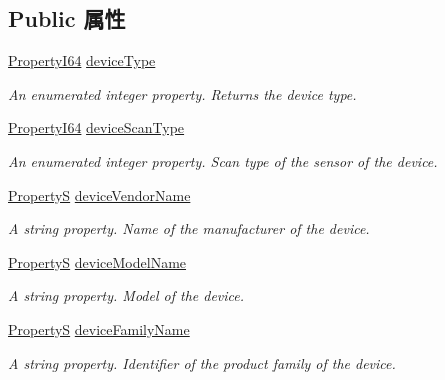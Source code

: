 \subsection*{Public 属性}
\begin{DoxyCompactItemize}
\item 
\hyperlink{group___common_interface_ga81749b2696755513663492664a18a893}{Property\+I64} \hyperlink{classmv_i_m_p_a_c_t_1_1acquire_1_1_gen_i_cam_1_1_device_control_a3dc9c27ac4a77bac7c2590ef4cb56f15}{device\+Type}
\begin{DoxyCompactList}\small\item\em An enumerated integer property. Returns the device type. \end{DoxyCompactList}\item 
\hyperlink{group___common_interface_ga81749b2696755513663492664a18a893}{Property\+I64} \hyperlink{classmv_i_m_p_a_c_t_1_1acquire_1_1_gen_i_cam_1_1_device_control_a9a0cf61d40c7454be475abefd64ab35d}{device\+Scan\+Type}
\begin{DoxyCompactList}\small\item\em An enumerated integer property. Scan type of the sensor of the device. \end{DoxyCompactList}\item 
\hyperlink{classmv_i_m_p_a_c_t_1_1acquire_1_1_property_s}{Property\+S} \hyperlink{classmv_i_m_p_a_c_t_1_1acquire_1_1_gen_i_cam_1_1_device_control_aea67bea3bea7c8c363bb3c6100e7004f}{device\+Vendor\+Name}
\begin{DoxyCompactList}\small\item\em A string property. Name of the manufacturer of the device. \end{DoxyCompactList}\item 
\hyperlink{classmv_i_m_p_a_c_t_1_1acquire_1_1_property_s}{Property\+S} \hyperlink{classmv_i_m_p_a_c_t_1_1acquire_1_1_gen_i_cam_1_1_device_control_acff42ebd94b18ac01212b623a8a4812f}{device\+Model\+Name}
\begin{DoxyCompactList}\small\item\em A string property. Model of the device. \end{DoxyCompactList}\item 
\hyperlink{classmv_i_m_p_a_c_t_1_1acquire_1_1_property_s}{Property\+S} \hyperlink{classmv_i_m_p_a_c_t_1_1acquire_1_1_gen_i_cam_1_1_device_control_a90c0fed8938bd8a829d44b3edf559ad3}{device\+Family\+Name}
\begin{DoxyCompactList}\small\item\em A string property. Identifier of the product family of the device. \end{DoxyCompactList}\item 

\end{DoxyCompactItemize}

